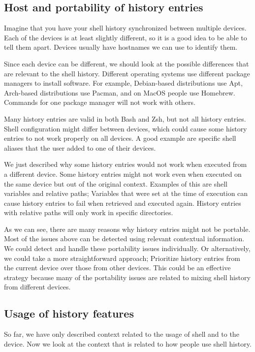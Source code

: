 \subsection{Host and portability of history entries}

Imagine that you have your shell history synchronized between multiple devices.
Each of the devices is at least slightly different, so it is a good idea to be able to tell them apart. Devices usually have hostnames we can use to identify them. 

Since each device can be different, we should look at the possible differences that are relevant to the shell history. Different operating systems use different package managers to install software. For example, Debian-based distributions use Apt, Arch-based distributions use Pacman, and on MacOS people use Homebrew. Commands for one package manager will not work with others.

Many history entries are valid in both Bash and Zsh, but not all history entries. Shell configuration might differ between devices, which could cause some history entries to not work properly on all devices. A good example are specific shell aliases that the user added to one of their devices.

We just described why some history entries would not work when executed from a different device. Some history entries might not work even when executed on the same device but out of the original context. Examples of this are shell variables and relative paths; Variables that were set at the time of execution can cause history entries to fail when retrieved and executed again. History entries with relative paths will only work in specific directories.

As we can see, there are many reasons why history entries might not be portable. Most of the issues above can be detected using relevant contextual information. 
We could detect and handle these portability issues individually. Or alternatively, we could take a more straightforward approach; Prioritize history entries from the current device over those from other devices. This could be an effective strategy because many of the portability issues are related to mixing shell history from different devices. 

\subsection{Usage of history features}

So far, we have only described context related to the usage of shell and to the device. Now we look at the context that is related to how people use shell history. 


